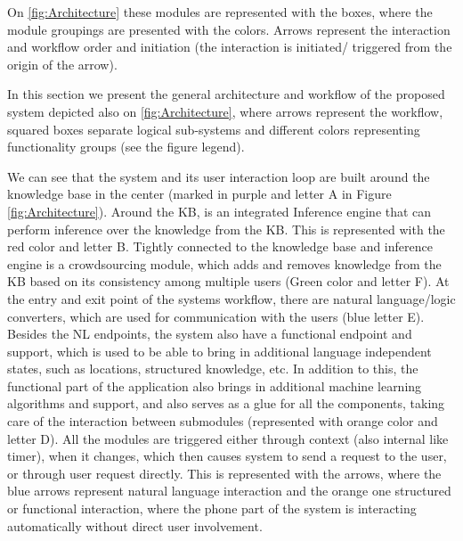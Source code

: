 On \autoref{fig:Architecture} these modules are represented with the boxes,
where the module groupings are presented with the colors. Arrows represent
the interaction and workflow order and initiation (the interaction is initiated/
triggered from the origin of the arrow).

In this section we present the general architecture and workflow of the proposed system depicted also on \ref{fig:Architecture}, where arrows represent the workflow, squared boxes separate logical sub-systems and different colors representing functionality groups (see the figure legend).

We can see that the system and its user interaction loop are built around the knowledge base in the center (marked in purple and letter A in Figure \ref{fig:Architecture}). Around the KB, is an integrated Inference engine that can perform inference over the knowledge from the KB. This is represented with the red color and letter B. Tightly connected to the knowledge base and inference engine is a crowdsourcing module, which adds and removes knowledge from the KB based on its consistency among multiple users (Green color and letter F). At the entry and exit point of the systems workflow, there are natural language/logic converters, which are used for communication with the users (blue letter E). Besides the NL endpoints, the system also have a functional endpoint and support, which is used to be able to bring in additional language independent states, such as locations, structured knowledge, etc. In addition to this, the functional part of the application also brings in additional machine learning algorithms and support, and also serves as a glue for all the components, taking care of the interaction between submodules (represented with orange color and letter D). All the modules are triggered either through context (also internal like timer), when it changes, which then causes system to send a request to the user, or through user request directly. This is represented with the arrows, where the blue arrows represent natural language interaction and the orange one structured or functional interaction, where the phone part of the system is interacting automatically without direct user involvement.

